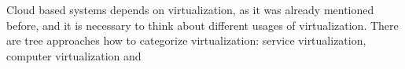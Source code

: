 
Cloud based systems depends on virtualization, as it was already mentioned before, and it is necessary to think about different usages of virtualization. There are tree approaches how to categorize virtualization: service virtualization, computer virtualization and 

